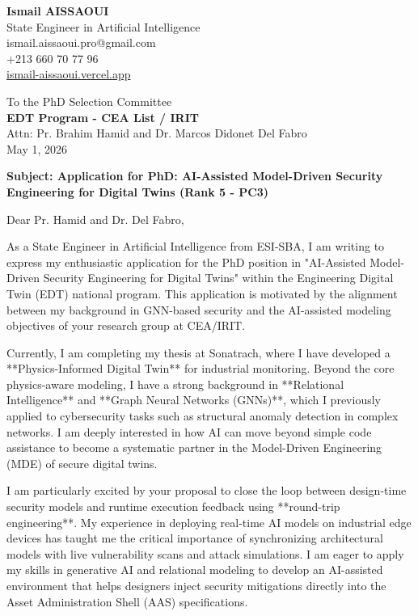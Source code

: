 \documentclass[a4paper,12pt]{article}
\begin{document}
\begin{flushleft}
    \textbf{Ismail AISSAOUI} \\
    State Engineer in Artificial Intelligence \\
    ismail.aissaoui.pro@gmail.com \\
    +213 660 70 77 96 \\
    \href{https://ismail-aissaoui.vercel.app}{ismail-aissaoui.vercel.app}
\end{flushleft}

\begin{flushright}
    To the PhD Selection Committee \\
    \textbf{EDT Program - CEA List / IRIT} \\
    Attn: Pr. Brahim Hamid and Dr. Marcos Didonet Del Fabro \\
    \medskip
    May 1, 2026
\end{flushright}

\bigskip

\noindent \textbf{Subject: Application for PhD: AI-Assisted Model-Driven Security Engineering for Digital Twins (Rank 5 - PC3)}

\bigskip

Dear Pr. Hamid and Dr. Del Fabro,

As a State Engineer in Artificial Intelligence from ESI-SBA, I am writing to express my enthusiastic application for the PhD position in "AI-Assisted Model-Driven Security Engineering for Digital Twins" within the Engineering Digital Twin (EDT) national program. This application is motivated by the alignment between my background in GNN-based security and the AI-assisted modeling objectives of your research group at CEA/IRIT.

Currently, I am completing my thesis at Sonatrach, where I have developed a **Physics-Informed Digital Twin** for industrial monitoring. Beyond the core physics-aware modeling, I have a strong background in **Relational Intelligence** and **Graph Neural Networks (GNNs)**, which I previously applied to cybersecurity tasks such as structural anomaly detection in complex networks. I am deeply interested in how AI can move beyond simple code assistance to become a systematic partner in the Model-Driven Engineering (MDE) of secure digital twins.

I am particularly excited by your proposal to close the loop between design-time security models and runtime execution feedback using **round-trip engineering**. My experience in deploying real-time AI models on industrial edge devices has taught me the critical importance of synchronizing architectural models with live vulnerability scans and attack simulations. I am eager to apply my skills in generative AI and relational modeling to develop an AI-assisted environment that helps designers inject security mitigations directly into the Asset Administration Shell (AAS) specifications.
\end{document}
